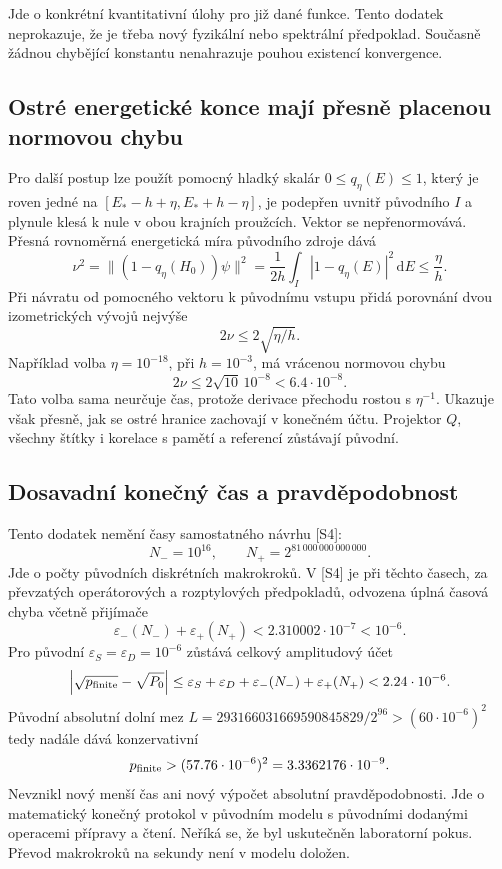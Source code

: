 \documentclass[11pt,a4paper]{article}
\theoremstyle{remark}\newtheorem{remark}[theorem]{Poznámka}
\numberwithin{equation}{section}
\begin{document}
Jde o konkrétní kvantitativní úlohy pro již dané funkce.
Tento dodatek neprokazuje, že je třeba nový fyzikální nebo
spektrální předpoklad. Současně žádnou chybějící konstantu
nenahrazuje pouhou existencí konvergence.

\subsection{Ostré energetické konce mají přesně placenou normovou chybu}

Pro další postup lze použít pomocný hladký skalár
\(0\le q_\eta(E)\le1\), který je roven jedné na
\([E_*-h+\eta,E_*+h-\eta]\), je podepřen uvnitř původního
\(I\) a plynule klesá k nule v obou krajních proužcích.
Vektor se nepřenormovává. Přesná rovnoměrná energetická míra
původního zdroje dává
\[
\nu^2=\|(1-q_\eta(H_0))\psi\|^2
=\frac1{2h}\int_I|1-q_\eta(E)|^2\,\mathrm dE
\le\frac{\eta}{h}.
\]
Při návratu od pomocného vektoru k původnímu vstupu přidá
porovnání dvou izometrických vývojů nejvýše
\[
2\nu\le2\sqrt{\eta/h}.
\]
Například volba \(\eta=10^{-18}\), při \(h=10^{-3}\),
má vrácenou normovou chybu
\[
2\nu\le2\sqrt{10}\,10^{-8}<6.4\cdot10^{-8}.
\]
Tato volba sama neurčuje čas, protože derivace přechodu
rostou s \(\eta^{-1}\). Ukazuje však přesně, jak se ostré
hranice zachovají v konečném účtu. Projektor \(Q\), všechny
štítky i korelace s pamětí a referencí zůstávají původní.

\subsection{Dosavadní konečný čas a pravděpodobnost}

Tento dodatek nemění časy samostatného návrhu [S4]:
\[
N_-=10^{16},\qquad N_+=2^{81\,000\,000\,000\,000}.
\]
Jde o počty původních diskrétních makrokroků. V [S4] je při
těchto časech, za převzatých operátorových a rozptylových
předpokladů, odvozena úplná časová chyba včetně přijímače
\[
\varepsilon_-(N_-)+\varepsilon_+(N_+)
<2.310002\cdot10^{-7}<10^{-6}.
\]
Pro původní \(\varepsilon_S=\varepsilon_D=10^{-6}\)
zůstává celkový amplitudový účet
\[
\left|\sqrt{p_{\rm finite}}-\sqrt{P_0}\right|
\le\varepsilon_S+\varepsilon_D+
\varepsilon_-(N_-)+\varepsilon_+(N_+)
<2.24\cdot10^{-6}.
\]
Původní absolutní dolní mez
\(L=293166031669590845829/2^{96}>(60\cdot10^{-6})^2\)
tedy nadále dává konzervativní
\[
p_{\rm finite}>(57.76\cdot10^{-6})^2
=3.3362176\cdot10^{-9}.
\]
Nevznikl nový menší čas ani nový výpočet absolutní
pravděpodobnosti. Jde o matematický konečný protokol
v původním modelu s původními dodanými operacemi přípravy
a čtení. Neříká se, že byl uskutečněn laboratorní pokus.
Převod makrokroků na sekundy není v modelu doložen.
\end{document}
